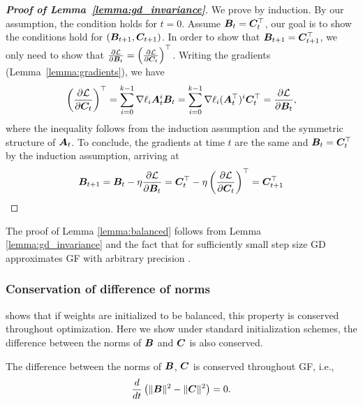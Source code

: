 \begin{proof}[\textbf{Proof of Lemma~\ref{lemma:gd_invariance}}]
We prove by induction. By our assumption, the condition holds for $t=0$. Assume ${\bm{B}}_t={\bm{C}}_t^\top$, our goal is to show the conditions hold for $({\bm{B}}_{t+1},{\bm{C}}_{t+1})$.
In order to show that ${\bm{B}}_{t+1}={\bm{C}}_{t+1}^\top$, we only need to show that $\frac{\partial \mathcal{L}}{\partial {\bm{B}}_t}=\left( \frac{\partial \mathcal{L}}{\partial {\bm{C}}_t} \right)^\top$. Writing the gradients (Lemma~\ref{lemma:gradients}), we have
\begin{equation}
    \left(\frac{\partial\mathcal{L}}{\partial {\bm{C}}_t}\right)^\top = \sum_{i=0}^{k-1}\nabla\ell_i {\bm{A}}_t^i{\bm{B}}_t =\sum_{i=0}^{k-1}\nabla\ell_i ({\bm{A}}_t^\top)^i {\bm{C}}_t^\top= \frac{\partial\mathcal{L}}{\partial {\bm{B}}_t},
\end{equation}
where the inequality follows from the induction assumption and the symmetric structure of ${\bm{A}}_t$. To conclude, the gradients at time $t$ are the same and ${\bm{B}}_t={\bm{C}}_t^\top$ by the induction assumption, arriving at
\begin{equation}
    {\bm{B}}_{t+1}={\bm{B}}_t-\eta\frac{\partial\mathcal{L}}{\partial {\bm{B}}_t}={\bm{C}}_t^\top - \eta \left(\frac{\partial\mathcal{L}}{\partial {\bm{C}}_t}\right)^\top={\bm{C}}_{t+1}^\top
\end{equation} 
\end{proof}


The proof of Lemma \ref{lemma:balanced} follows from Lemma \ref{lemma:gd_invariance} and the fact that for sufficiently small step size GD approximates GF with arbitrary precision  \citep[see Theorem 3 in][]{elkabetz2021continuous}.

\subsubsection{Conservation of difference of norms}

 shows that if weights are initialized to be balanced, this property is conserved throughout optimization. Here we show under standard initialization schemes, the difference between the norms of ${\bm{B}}$ and ${\bm{C}}$ is also conserved.

\begin{lemma}\label{lemma:preserve_norm_diff}
The difference between the norms of ${\bm{B}}$, ${\bm{C}}$ is conserved throughout GF, i.e.,
\begin{equation}
    \frac{d}{dt}\left(\|{\bm{B}}\|^2 -  \|{\bm{C}}\|^2 \right) = 0.
\end{equation}
\end{lemma}


